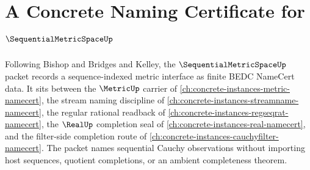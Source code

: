 \chapter{A Concrete Naming Certificate for $\SequentialMetricSpaceUp$}
\label{ch:concrete-instances-sequential-metric-space-namecert}

Following Bishop and Bridges and Kelley, the $\SequentialMetricSpaceUp$ packet records a sequence-indexed metric interface as finite BEDC NameCert data. It sits between the $\MetricUp$ carrier of \autoref{ch:concrete-instances-metric-namecert}, the stream naming discipline of \autoref{ch:concrete-instances-streamname-namecert}, the regular rational readback of \autoref{ch:concrete-instances-regseqrat-namecert}, the $\RealUp$ completion seal of \autoref{ch:concrete-instances-real-namecert}, and the filter-side completion route of \autoref{ch:concrete-instances-cauchyfilter-namecert}. The packet names sequential Cauchy observations without importing host sequences, quotient completions, or an ambient completeness theorem.

